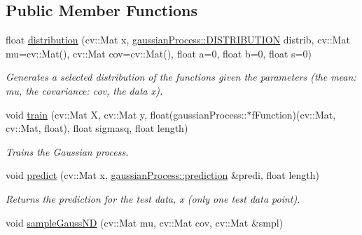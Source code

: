 \subsection*{Public Member Functions}
\begin{DoxyCompactItemize}
\item 
\hypertarget{classgaussianProcess_ae835399df27c37274ada71f8947381bd}{
float \hyperlink{classgaussianProcess_ae835399df27c37274ada71f8947381bd}{distribution} (cv::Mat x, \hyperlink{classgaussianProcess_ade80fdcd8f2dde57393f56d0cdfaeed0}{gaussianProcess::DISTRIBUTION} distrib, cv::Mat mu=cv::Mat(), cv::Mat cov=cv::Mat(), float a=0, float b=0, float s=0)}
\label{classgaussianProcess_ae835399df27c37274ada71f8947381bd}

\begin{DoxyCompactList}\small\item\em Generates a selected distribution of the functions given the parameters (the mean: mu, the covariance: cov, the data x). \item\end{DoxyCompactList}\item 
\hypertarget{classgaussianProcess_a264d24f5b45c7a75924b0a826c0ee03e}{
void \hyperlink{classgaussianProcess_a264d24f5b45c7a75924b0a826c0ee03e}{train} (cv::Mat X, cv::Mat y, float(gaussianProcess::$\ast$fFunction)(cv::Mat, cv::Mat, float), float sigmasq, float length)}
\label{classgaussianProcess_a264d24f5b45c7a75924b0a826c0ee03e}

\begin{DoxyCompactList}\small\item\em Trains the Gaussian process. \item\end{DoxyCompactList}\item 
\hypertarget{classgaussianProcess_a648110da0356de011d34f4d2d7604581}{
void \hyperlink{classgaussianProcess_a648110da0356de011d34f4d2d7604581}{predict} (cv::Mat x, \hyperlink{structgaussianProcess_1_1prediction}{gaussianProcess::prediction} \&predi, float length)}
\label{classgaussianProcess_a648110da0356de011d34f4d2d7604581}

\begin{DoxyCompactList}\small\item\em Returns the prediction for the test data, x (only one test data point). \item\end{DoxyCompactList}\item 
\hypertarget{classgaussianProcess_a834dc239dccb2b3ce692f8b62c0d62b2}{
void \hyperlink{classgaussianProcess_a834dc239dccb2b3ce692f8b62c0d62b2}{sampleGaussND} (cv::Mat mu, cv::Mat cov, cv::Mat \&smpl)}
\label{classgaussianProcess_a834dc239dccb2b3ce692f8b62c0d62b2}


\end{DoxyCompactItemize}

